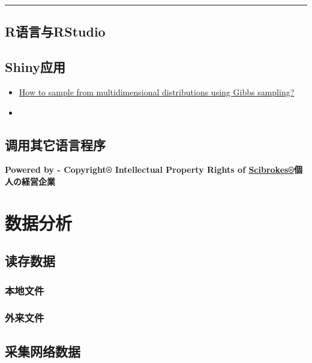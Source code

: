 \documentclass[]{book}
\providecommand{\tightlist}{%
  \setlength{\itemsep}{0pt}\setlength{\parskip}{0pt}}
\theoremstyle{definition}
\theoremstyle{definition}
\theoremstyle{definition}
\theoremstyle{remark}
\begin{document}
\begin{center}\rule{0.5\linewidth}{\linethickness}\end{center}

\section{R语言与RStudio}\label{rrstudio}

\section{Shiny应用}\label{shiny}

\begin{itemize}
\tightlist
\item
  \href{https://appsilon.com/how-to-sample-from-multidimensional-distributions-using-gibbs-sampling/}{How
  to sample from multidimensional distributions using Gibbs sampling?}
\item
  \href{}{}
\end{itemize}

\section{调用其它语言程序}

\textbf{Powered by - Copyright® Intellectual Property Rights of
\href{http://www.scibrokes.com}{Scibrokes®}個人の経営企業}

\chapter{数据分析}\label{analytics}

\section{读存数据}

\subsection{本地文件}

\subsection{外来文件}

\section{采集网络数据}
\end{document}
